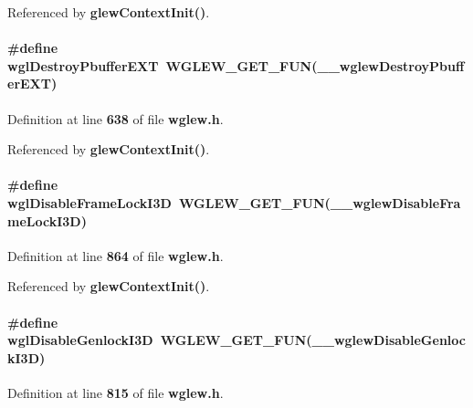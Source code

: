 Referenced by {\bf glew\+Context\+Init()}.

\paragraph[{wgl\+Destroy\+Pbuffer\+E\+XT}]{\setlength{\rightskip}{0pt plus 5cm}\#define wgl\+Destroy\+Pbuffer\+E\+XT~{\bf W\+G\+L\+E\+W\+\_\+\+G\+E\+T\+\_\+\+F\+UN}({\bf \+\_\+\+\_\+wglew\+Destroy\+Pbuffer\+E\+XT})}\label{wglew_8h_a01d8966a7aea753d515204a2830bc366}


Definition at line {\bf 638} of file {\bf wglew.\+h}.



Referenced by {\bf glew\+Context\+Init()}.

\paragraph[{wgl\+Disable\+Frame\+Lock\+I3D}]{\setlength{\rightskip}{0pt plus 5cm}\#define wgl\+Disable\+Frame\+Lock\+I3D~{\bf W\+G\+L\+E\+W\+\_\+\+G\+E\+T\+\_\+\+F\+UN}({\bf \+\_\+\+\_\+wglew\+Disable\+Frame\+Lock\+I3D})}\label{wglew_8h_ab6d7668587413126646b34695bb4e890}


Definition at line {\bf 864} of file {\bf wglew.\+h}.



Referenced by {\bf glew\+Context\+Init()}.

\paragraph[{wgl\+Disable\+Genlock\+I3D}]{\setlength{\rightskip}{0pt plus 5cm}\#define wgl\+Disable\+Genlock\+I3D~{\bf W\+G\+L\+E\+W\+\_\+\+G\+E\+T\+\_\+\+F\+UN}({\bf \+\_\+\+\_\+wglew\+Disable\+Genlock\+I3D})}\label{wglew_8h_a7b4cb8bd1c1839a0d814140ef56eaa2b}


Definition at line {\bf 815} of file {\bf wglew.\+h}.



